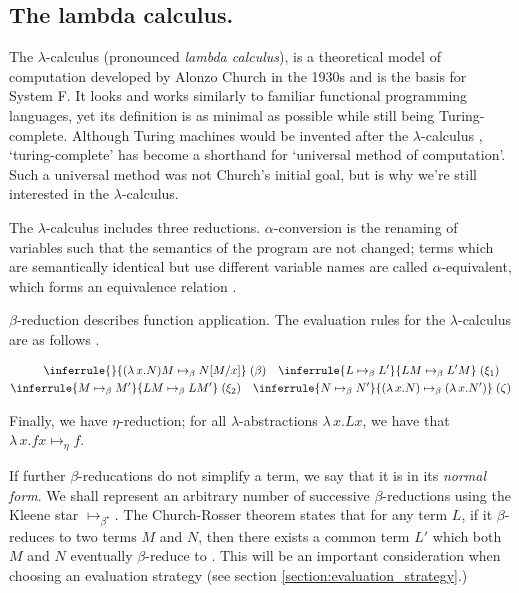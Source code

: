 \subsection{The lambda calculus.}
The $\lambda$-calculus (pronounced \textit{lambda calculus}), is a theoretical model of computation
developed by Alonzo Church in the 1930s \citep{church_set_1932} and is the basis for System F. It
looks and works similarly to familiar functional programming languages, yet its definition is as
minimal as possible while still being Turing-complete. Although Turing machines would be invented
after the $\lambda$-calculus \citep{turing_computable_1937}, `turing-complete' has become a
shorthand for `universal method of computation'. Such a universal method was not Church's initial
goal, but is why we're still interested in the $\lambda$-calculus.

The $\lambda$-calculus includes three reductions. $\alpha$-conversion is the renaming of variables
such that the semantics of the program are not changed; terms which are semantically identical but
use different variable names are called $\alpha$-equivalent, which forms an equivalence relation
\citep{pierce_types_2002}.

$\beta$-reduction describes function application. The evaluation rules for the $\lambda$-calculus
are as follows \citep{wadler_programming_2022}.

\begin{align}
\label{equation:untyped_beta_rules}
\begin{split}
\inferrule{ }{(\lambda \, x. N)M \mapsto_{\beta} N[M/x]} \; (\beta) \quad
\inferrule{L \mapsto_{\beta} L'}{LM \mapsto_{\beta} L'M} \; (\xi_1) \quad\\
\inferrule{M \mapsto_{\beta} M'}{LM \mapsto_{\beta} LM'} \; (\xi_2) \quad
\inferrule{N \mapsto_{\beta} N'}{(\lambda \, x. N) \mapsto_{\beta} (\lambda \, x. N')} \; (\zeta)
\end{split}
\end{align}

Finally, we have $\eta$-reduction; for all $\lambda$-abstractions $\lambda \, x. L x$, we have that
$\lambda \, x. f x \mapsto_{\eta} f$.

If further $\beta$-reducations do not simplify a term, we say that it is in its \textit{normal
form}. We shall represent an arbitrary number of successive $\beta$-reductions using the Kleene star
$\mapsto_{\beta^{\star}}$. The Church-Rosser theorem states that for any term $L$, if it
$\beta$-reduces to two terms $M$ and $N$, then there exists a common term $L'$ which both $M$ and
$N$ eventually $\beta$-reduce to \citep{church_properties_1936}. This will be an important
consideration when choosing an evaluation strategy (see section \ref{section:evaluation_strategy}.)

